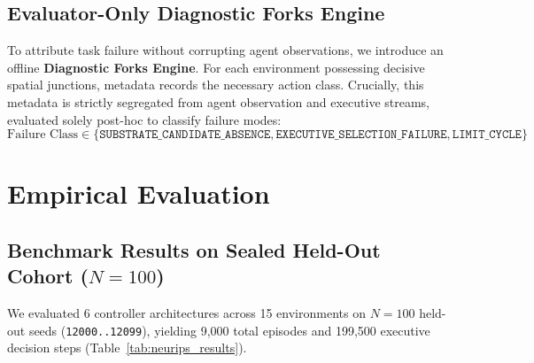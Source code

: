 \documentclass{article}
\begin{document}
\subsection{Evaluator-Only Diagnostic Forks Engine}

To attribute task failure without corrupting agent observations, we introduce an offline \textbf{Diagnostic Forks Engine}. For each environment possessing decisive spatial junctions, metadata records the necessary action class. Crucially, this metadata is strictly segregated from agent observation and executive streams, evaluated solely post-hoc to classify failure modes:
\begin{equation}
\text{Failure Class} \in \{\texttt{SUBSTRATE\_CANDIDATE\_ABSENCE}, \texttt{EXECUTIVE\_SELECTION\_FAILURE}, \texttt{LIMIT\_CYCLE}\}
\end{equation}

\section{Empirical Evaluation}

\subsection{Benchmark Results on Sealed Held-Out Cohort ($N = 100$)}

We evaluated 6 controller architectures across 15 environments on $N = 100$ held-out seeds (\texttt{12000..12099}), yielding 9,000 total episodes and 199,500 executive decision steps (Table~\ref{tab:neurips_results}).
\end{document}
